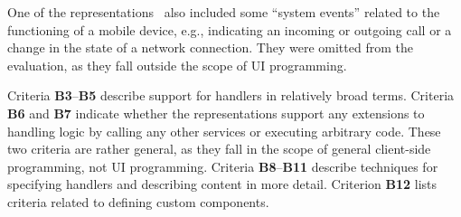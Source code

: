 One of the representations~\cite{Gaouar2018} also included some \enquote{system events} related to the functioning of a mobile device, e.g., indicating an incoming or outgoing call or a change in the state of a network connection.
They were omitted from the evaluation, as they fall outside the scope of UI programming.

Criteria \textbf{B3}--\textbf{B5} describe support for handlers in relatively broad terms.
Criteria \textbf{B6} and \textbf{B7} indicate whether the representations support any extensions to handling logic by calling any other services or executing arbitrary code.
These two criteria are rather general, as they fall in the scope of general client-side programming, not UI programming.
Criteria \textbf{B8}--\textbf{B11} describe techniques for specifying handlers and describing content in more detail.
Criterion \textbf{B12} lists criteria related to defining custom components.

